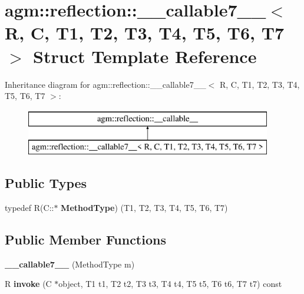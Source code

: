 \hypertarget{structagm_1_1reflection_1_1____callable7____}{}\section{agm\+:\+:reflection\+:\+:\+\_\+\+\_\+callable7\+\_\+\+\_\+$<$ R, C, T1, T2, T3, T4, T5, T6, T7 $>$ Struct Template Reference}
\label{structagm_1_1reflection_1_1____callable7____}
Inheritance diagram for agm\+:\+:reflection\+:\+:\+\_\+\+\_\+callable7\+\_\+\+\_\+$<$ R, C, T1, T2, T3, T4, T5, T6, T7 $>$\+:\begin{figure}[H]
\begin{center}
\leavevmode
\includegraphics[height=2.000000cm]{structagm_1_1reflection_1_1____callable7____}
\end{center}
\end{figure}
\subsection*{Public Types}
\begin{DoxyCompactItemize}
\item 
typedef R(C\+::$\ast$ {\bfseries Method\+Type}) (T1, T2, T3, T4, T5, T6, T7)\hypertarget{structagm_1_1reflection_1_1____callable7_____ade89eddfb2e620cf8c90cc1063d86d34}{}\label{structagm_1_1reflection_1_1____callable7_____ade89eddfb2e620cf8c90cc1063d86d34}

\end{DoxyCompactItemize}
\subsection*{Public Member Functions}
\begin{DoxyCompactItemize}
\item 
{\bfseries \+\_\+\+\_\+callable7\+\_\+\+\_\+} (Method\+Type m)\hypertarget{structagm_1_1reflection_1_1____callable7_____aca588263c31aac83f9be5a5c046b11b2}{}\label{structagm_1_1reflection_1_1____callable7_____aca588263c31aac83f9be5a5c046b11b2}

\item 
R {\bfseries invoke} (C $\ast$object, T1 t1, T2 t2, T3 t3, T4 t4, T5 t5, T6 t6, T7 t7) const \hypertarget{structagm_1_1reflection_1_1____callable7_____ad9dff74adaf2b59c31ad92a33980183d}{}\label{structagm_1_1reflection_1_1____callable7_____ad9dff74adaf2b59c31ad92a33980183d}

\end{DoxyCompactItemize}

